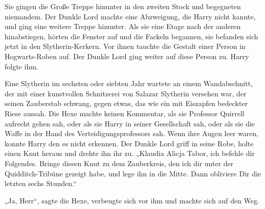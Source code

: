 Sie gingen die Große Treppe hinunter in den zweiten Stock und begegneten niemandem.
Der Dunkle Lord machte eine Abzweigung, die Harry nicht kannte, und ging eine weitere Treppe hinunter. Als sie eine Etage nach der anderen hinabstiegen, hörten die Fenster auf und die Fackeln begannen, sie befanden sich jetzt in den Slytherin-Kerkern.
Vor ihnen tauchte die Gestalt einer Person in Hogwarts-Roben auf.
Der Dunkle Lord ging weiter auf diese Person zu.
Harry folgte ihm.

Eine Slytherin im sechsten oder siebten Jahr wartete an einem Wandabschnitt, der mit einer kunstvollen Schnitzerei von Salazar Slytherin versehen war, der seinen Zauberstab schwang, gegen etwas, das wie ein mit Eiszapfen bedeckter Riese aussah. Die Hexe machte keinen Kommentar, als sie Professor Quirrell aufrecht gehen sah, oder als sie Harry in seiner Gesellschaft sah, oder als sie die Waffe in der Hand des Verteidigungsprofessors sah. Wenn ihre Augen leer waren, konnte Harry den es nicht erkennen.
Der Dunkle Lord griff in seine Robe, holte einen Knut heraus und drehte ihn ihr zu.
„Klaudia Alicja Tabor, ich befehle dir Folgendes. Bringe diesen Knut zu dem Zauberkreis, den ich dir unter der Quidditch-Tribüne gezeigt habe, und lege ihn in die Mitte. Dann obliviere Dir die letzten sechs Stunden.“

„Ja, Herr“, sagte die Hexe, verbeugte sich vor ihm und machte sich auf den Weg.

